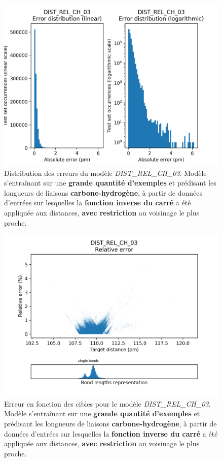 \begin{figure}[!h]
	\centering
	
	\includegraphics[scale=0.75]{../figures/DIST_REL_CH_03/DIST_REL_CH_03_distrib_rmse_val.png}	
	
	\caption{Distribution des erreurs du modèle \emph{DIST\_REL\_CH\_03}. Modèle s'entraînant sur une \textbf{grande quantité d'exemples} et prédisant les longueurs de liaisons \textbf{carbone-hydrogène}, à partir de données d'entrées sur lesquelles la \textbf{fonction inverse du carré} a été appliquée aux distances, \textbf{avec restriction} au voisinage le plus proche.}
\end{figure}

\begin{figure}[!h]
	\centering
	
	\includegraphics[scale=0.75]{../figures/DIST_REL_CH_03/DIST_REL_CH_03_distrib_rmse_dist.png}	
	
	\caption{Erreur en fonction des cibles pour le modèle \emph{DIST\_REL\_CH\_03}. Modèle s'entraînant sur une \textbf{grande quantité d'exemples} et prédisant les longueurs de liaisons \textbf{carbone-hydrogène}, à partir de données d'entrées sur lesquelles la \textbf{fonction inverse du carré} a été appliquée aux distances, \textbf{avec restriction} au voisinage le plus proche.}
\end{figure}

